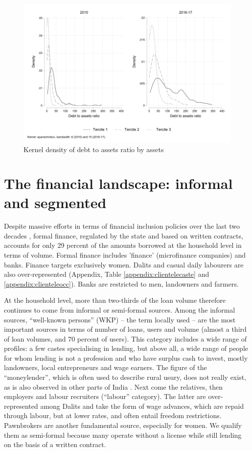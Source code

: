 \documentclass[a4paper, 11pt, onecolumn]{article}
\begin{document}
\begin{figure}[h!]
\center
\includegraphics[width=12cm]{DAR_tercile.pdf}
\caption{Kernel density of debt to assets ratio by assets}
\label{kernel:DARassets}
\end{figure}



\section{The financial landscape: informal and segmented}
\label{section:finlandscape}

Despite massive efforts in terms of financial inclusion policies over the last two decades \citep{Nair2016, Kar2018}, formal finance, regulated by the state and based on written contracts, accounts for only 29 percent of the amounts borrowed at the household level in terms of volume. Formal finance includes 'finance' (microfinance companies) and banks. Finance targets exclusively women. Dalits and casual daily labourers are also over-represented (Appendix, Table \ref{appendix:clientelecaste} and \ref{appendix:clienteleocc}). Banks are restricted to men, landowners and farmers. 

At the household level, more than two-thirds of the loan volume therefore continues to come from informal or semi-formal sources. Among the informal sources, ``well-known persons'' (WKP) – the term locally used – are the most important sources in terms of number of loans, users and volume (almost a third of loan volumes, and 70 percent of users). This category includes a wide range of profiles: a few castes specialising in lending, but above all, a wide range of people for whom lending is not a profession and who have surplus cash to invest, mostly landowners, local entrepreneurs and wage earners. The figure of the ``moneylender'', which is often used to describe rural usury, does not really exist, as is also observed in other parts of India \citep{Gregory1997}. Next come the relatives, then employers and labour recruiters (“labour” category). The latter are over-represented among Dalits and take the form of wage advances, which are repaid through labour, but at lower rates, and often entail freedom restrictions. Pawnbrokers are another fundamental source, especially for women. We qualify them as semi-formal because many operate without a license while still lending on the basis of a written contract. 
\end{document}
